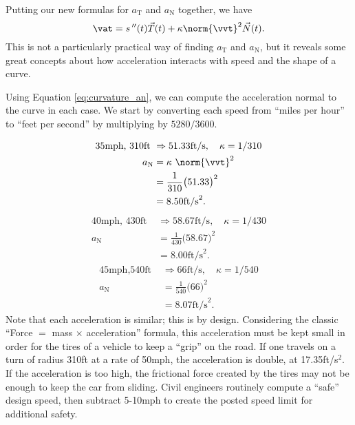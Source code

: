 Putting our new formulas for $a_\text{T}$ and $a_\text{N}$ together, we have 
$$\vat = s\,''(t)\vec T(t) + \kappa\norm{\vvt}^2\vec N(t).$$
This is not a particularly practical way of finding $a_\text{T}$ and $a_\text{N}$, but it reveals some great concepts about how acceleration interacts with speed and the shape of a curve.\\

{
Using Equation \eqref{eq:curvature_an}, we can compute the acceleration normal to the curve in each case. We start by converting each speed from ``miles per hour'' to ``feet per second'' by multiplying by $5280/3600$.

\begin{align*}
\text{35mph, 310ft } &\Rightarrow 51.33\text{ft/s},\quad \kappa = 1/310 \\
			a_\text{N}&= \kappa\ \norm{\vvt}^2\\ 
							&= \frac1{310}\big(51.33\big)^2 \\
							&= 8.50\text{ft/s}^2.
\end{align*}
\begin{align*}
\text{40mph, 430ft } &\Rightarrow 58.67\text{ft/s},\quad \kappa = 1/430 \\
			a_\text{N}&= \frac1{430}\big(58.67\big)^2 \\
							&= 8.00\text{ft/s}^2.
\end{align*}
\begin{align*}
\text{45mph,540ft } &\Rightarrow 66\text{ft/s},\quad \kappa = 1/540 \\
			a_\text{N}&= \frac1{540}\big(66\big)^2 \\
							&= 8.07\text{ft/s}^2.
\end{align*}
Note that each acceleration is similar; this is by design. Considering the classic ``Force $=$ mass $\times$ acceleration'' formula, this acceleration must be kept small in order for the tires of a vehicle to keep a ``grip'' on the road. If one travels on a turn of radius 310ft at a rate of 50mph, the acceleration is double, at 17.35ft/s$^2$. If the acceleration is too high, the frictional force created by the tires may not be enough to keep the car from sliding. Civil engineers routinely compute a ``safe'' design speed, then subtract 5-10mph to create the posted speed limit for additional safety.
}\\

